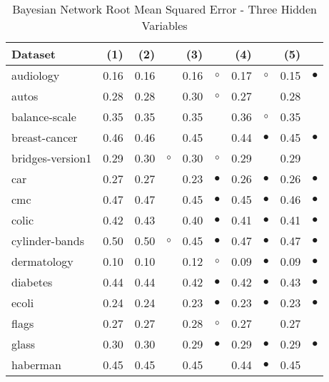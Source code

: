 \begin{table}[thb]
\caption{\label{bnrmse3}Bayesian Network Root Mean Squared Error - Three Hidden Variables}
\footnotesize
{\centering \begin{tabular}{lrr@{\hspace{0.1cm}}cr@{\hspace{0.1cm}}cr@{\hspace{0.1cm}}cr@{\hspace{0.1cm}}c}
\\
\hline
Dataset & (1)& (2) & & (3) & & (4) & & (5) & \\
\hline
audiology & 0.16 & 0.16 &           & 0.16 &   $\circ$ & 0.17 &   $\circ$ & 0.15 & $\bullet$\\
autos & 0.28 & 0.28 &           & 0.30 &   $\circ$ & 0.27 &           & 0.28 &          \\
balance-scale & 0.35 & 0.35 &           & 0.35 &           & 0.36 &   $\circ$ & 0.35 &          \\
breast-cancer & 0.46 & 0.46 &           & 0.45 &           & 0.44 & $\bullet$ & 0.45 & $\bullet$\\
bridges-version1 & 0.29 & 0.30 &   $\circ$ & 0.30 &   $\circ$ & 0.29 &           & 0.29 &          \\
car & 0.27 & 0.27 &           & 0.23 & $\bullet$ & 0.26 & $\bullet$ & 0.26 & $\bullet$\\
cmc & 0.47 & 0.47 &           & 0.45 & $\bullet$ & 0.45 & $\bullet$ & 0.46 & $\bullet$\\
colic & 0.42 & 0.43 &           & 0.40 & $\bullet$ & 0.41 & $\bullet$ & 0.41 & $\bullet$\\
cylinder-bands & 0.50 & 0.50 &   $\circ$ & 0.45 & $\bullet$ & 0.47 & $\bullet$ & 0.47 & $\bullet$\\
dermatology & 0.10 & 0.10 &           & 0.12 &   $\circ$ & 0.09 & $\bullet$ & 0.09 & $\bullet$\\
diabetes & 0.44 & 0.44 &           & 0.42 & $\bullet$ & 0.42 & $\bullet$ & 0.43 & $\bullet$\\
ecoli & 0.24 & 0.24 &           & 0.23 & $\bullet$ & 0.23 & $\bullet$ & 0.23 & $\bullet$\\
flags & 0.27 & 0.27 &           & 0.28 &   $\circ$ & 0.27 &           & 0.27 &          \\
glass & 0.30 & 0.30 &           & 0.29 & $\bullet$ & 0.29 & $\bullet$ & 0.29 & $\bullet$\\
haberman & 0.45 & 0.45 &           & 0.45 &           & 0.44 & $\bullet$ & 0.45 &          \\

\end{tabular}}
\end{table}
